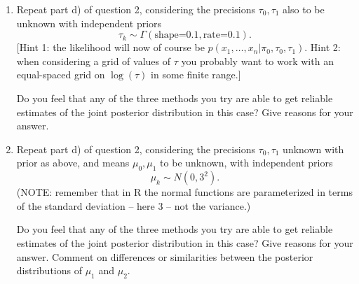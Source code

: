 \documentclass[12pt]{article}
\begin{document}
\begin{enumerate}
\item Repeat part d) of question 2, considering the precisions $\tau_0,\tau_1$ also to be unknown with independent priors
\begin{equation}
\tau_k \sim \Gamma(\text{shape=0.1},\text{rate=0.1}).
\end{equation}
[Hint 1: the likelihood will now of course be $p(x_1,\dots,x_n | \pi_0,\tau_0,\tau_1)$. 
Hint 2: when considering a grid of values of $\tau$ you probably want to work with an equal-spaced grid on $\log(\tau)$ in some finite range.]

Do you feel that any of the three methods you try are able to get reliable estimates of the joint posterior distribution in this case? Give reasons
for your answer.

\item Repeat part d) of question 2, considering the precisions $\tau_0,\tau_1$ unknown with prior as above, and means $\mu_0,\mu_1$ to be unknown, with 
independent priors
\begin{equation}
\mu_k \sim N(0,3^2).
\end{equation}
(NOTE: remember that in R the normal functions are parameterized in terms of the standard deviation -- here 3 -- not the variance.)

Do you feel that any of the three methods you try  are able to get reliable estimates of the joint posterior distribution in this case? Give reasons
for your answer.  Comment on differences or similarities between the posterior distributions of $\mu_1$ and $\mu_2$.
 
\end{enumerate}
\end{document}
